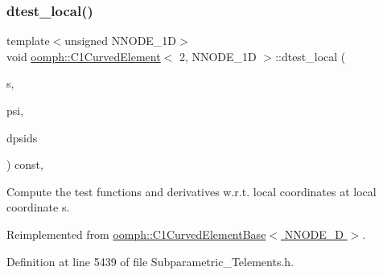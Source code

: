 \subsubsection{\texorpdfstring{dtest\+\_\+local()}{dtest\_local()}}
{\footnotesize\ttfamily template$<$unsigned N\+N\+O\+D\+E\+\_\+1D$>$ \\
void \hyperlink{classoomph_1_1C1CurvedElement}{oomph\+::\+C1\+Curved\+Element}$<$ 2, N\+N\+O\+D\+E\+\_\+1D $>$\+::dtest\+\_\+local (\begin{DoxyParamCaption}\item[{const \hyperlink{classoomph_1_1Vector}{Vector}$<$ double $>$ \&}]{s,  }\item[{\hyperlink{classoomph_1_1Shape}{Shape} \&}]{psi,  }\item[{\hyperlink{classoomph_1_1DShape}{D\+Shape} \&}]{dpsids }\end{DoxyParamCaption}) const\hspace{0.3cm}{\ttfamily [inline]}, {\ttfamily [virtual]}}



Compute the test functions and derivatives w.\+r.\+t. local coordinates at local coordinate s. 



Reimplemented from \hyperlink{classoomph_1_1C1CurvedElementBase_a49a851713b2d274f14602f05733470fa}{oomph\+::\+C1\+Curved\+Element\+Base$<$ N\+N\+O\+D\+E\+\_\+D $>$}.



Definition at line 5439 of file Subparametric\+\_\+\+Telements.\+h.

\mbox{\label{classoomph_1_1C1CurvedElement_3_012_00_01NNODE__1D_01_4_a4cb17f4e7f9253ff739a6102f1f39158}} 
